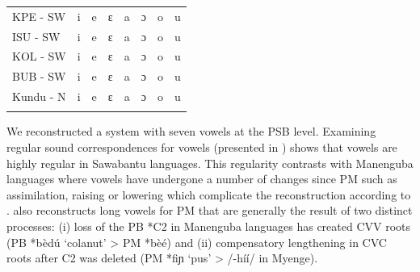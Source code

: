 \documentclass[output=paper,colorlinks,citecolor=brown
]{langscibook}
\begin{document}
\begin{table}[b]
\begin{tabular}{lrrrrrrr}
KPE - SW     & i           & e           & ɛ           & a           & ɔ           & o           & u           \\
ISU - SW     & i           & e           & ɛ           & a           & ɔ           & o           & u           \\
KOL - SW     & i           & e           & ɛ           & a           & ɔ           & o           & u           \\
BUB - SW     & i           & e           & ɛ           & a           & ɔ           & o           & u           \\
Kundu - N    & i           & e           & ɛ           & a           & ɔ           & o           & u          \\
   \lspbottomrule
 \end{tabular}
\end{table}


We reconstructed a system with seven vowels at the PSB level. Examining regular sound correspondences for vowels (presented in ) shows that vowels are highly regular in Sawabantu languages. This regularity contrasts with Manenguba languages where vowels have undergone a number of changes since PM such as assimilation, raising or lowering which complicate the reconstruction according to \citet[44-45]{hedinger1987}.  \citet[45-46]{hedinger1987} also reconstructs long vowels for PM that are generally the result of two distinct processes: (i) loss of the PB *C2 in Manenguba languages has created CVV roots (PB *bèdú `colanut' > PM *bèé) and (ii) compensatory lengthening in CVC roots after C2 was deleted (PM *fiɲ `pus' > /-híí/ in Myenge). 
\end{document}
